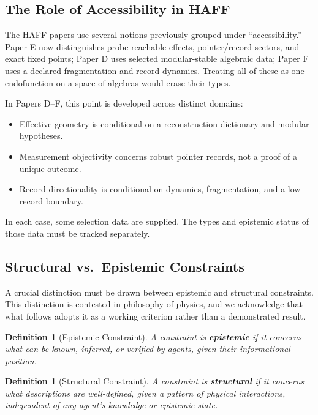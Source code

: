 \documentclass[12pt,a4paper,openany]{book}
\newtheorem{definition}[theorem]{Definition}
\begin{document}
\subsection{The Role of Accessibility in HAFF}

The HAFF papers use several notions previously grouped under ``accessibility.''  Paper E now distinguishes probe-reachable effects, pointer/record sectors, and exact fixed points; Paper D uses selected modular-stable algebraic data; Paper F uses a declared fragmentation and record dynamics.  Treating all of these as one endofunction on a space of algebras would erase their types.

In Papers D--F, this point is developed across distinct domains:

\begin{itemize}
    \item Effective geometry is conditional on a reconstruction dictionary and modular hypotheses.
    \item Measurement objectivity concerns robust pointer records, not a proof of a unique outcome.
    \item Record directionality is conditional on dynamics, fragmentation, and a low-record boundary.
\end{itemize}

In each case, some selection data are supplied.  The types and epistemic status of those data must be tracked separately.

\subsection{Structural vs.\ Epistemic Constraints}

A crucial distinction must be drawn between epistemic and structural constraints. This distinction is contested in philosophy of physics, and we acknowledge that what follows adopts it as a working criterion rather than a demonstrated result.

\begin{definition}[Epistemic Constraint]
A constraint is \textbf{epistemic} if it concerns what can be known, inferred, or verified by agents, given their informational position.
\end{definition}

\begin{definition}[Structural Constraint]
A constraint is \textbf{structural} if it concerns what descriptions are well-defined, given a pattern of physical interactions, independent of any agent's knowledge or epistemic state.
\end{definition}
\end{document}
